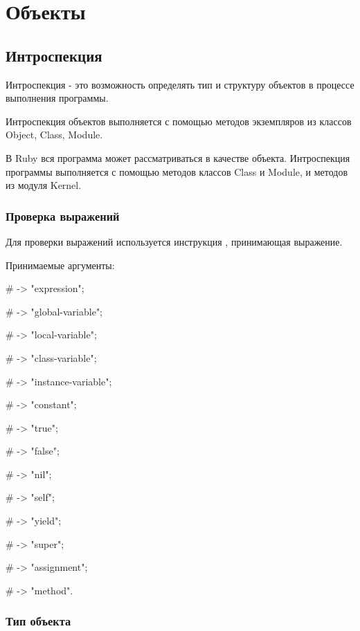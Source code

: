\chapter{Объекты}

\section{Интроспекция}

Интроспекция - это возможность определять тип и структуру объектов в процессе выполнения программы.

Интроспекция объектов выполняется с помощью методов экземпляров из классов Object, Class, Module.

В Ruby вся программа может рассматриваться в качестве объекта. Интроспекция программы выполняется с помощью методов классов Class и Module, и методов из модуля Kernel.

\subsection{Проверка выражений}
Для проверки выражений используется инструкция , принимающая выражение. 
\begin{keylist}{Принимаемые аргументы:}
  
  \# -> "expression";
  
  \# -> "global-variable"; 
  
  \# -> "local-variable"; 
  
  \# -> "class-variable"; 
  
  \# -> "instance-variable"; 
  
  \# -> "constant";
  
  \# -> "true";
  
  \# -> "false";
  
  \# -> "nil"; 
  
  \# -> "self";
  
  \# -> "yield";
  
  \# -> "super"; 
  
  \# -> "assignment"; 
  
  \# -> "method". 
\end{keylist}

\subsection{Тип объекта}

